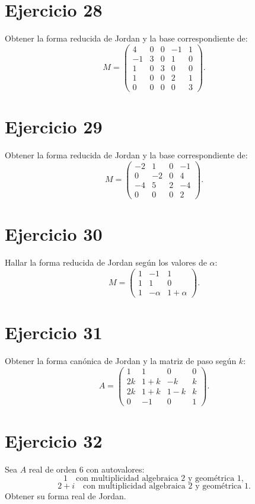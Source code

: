 \documentclass[11pt,a4paper]{article}
\begin{document}
\section{Ejercicio 28}
Obtener la forma reducida de Jordan y la base correspondiente de:
\[
M=
\begin{pmatrix}
4&0&0&-1&1\\
-1&3&0&1&0\\
1&0&3&0&0\\
1&0&0&2&1\\
0&0&0&0&3
\end{pmatrix}.
\]

\section{Ejercicio 29}
Obtener la forma reducida de Jordan y la base correspondiente de:
\[
M=
\begin{pmatrix}
-2&1&0&-1\\
0&-2&0&4\\
-4&5&2&-4\\
0&0&0&2
\end{pmatrix}.
\]

\section{Ejercicio 30}
Hallar la forma reducida de Jordan según los valores de $\alpha$:
\[
M=
\begin{pmatrix}
1&-1&1\\
1&1&0\\
1&-\alpha&1+\alpha
\end{pmatrix}.
\]

\section{Ejercicio 31}
Obtener la forma canónica de Jordan y la matriz de paso según $k$:
\[
A=
\begin{pmatrix}
1&1&0&0\\
2k&1+k&-k&k\\
2k&1+k&1-k&k\\
0&-1&0&1
\end{pmatrix}.
\]

\section{Ejercicio 32}
Sea $A$ real de orden $6$ con autovalores:
\[
1\quad\text{con multiplicidad algebraica }2
\text{ y geométrica }1,
\]
\[
2+i\quad\text{con multiplicidad algebraica }2
\text{ y geométrica }1.
\]
Obtener su forma real de Jordan.
\end{document}
